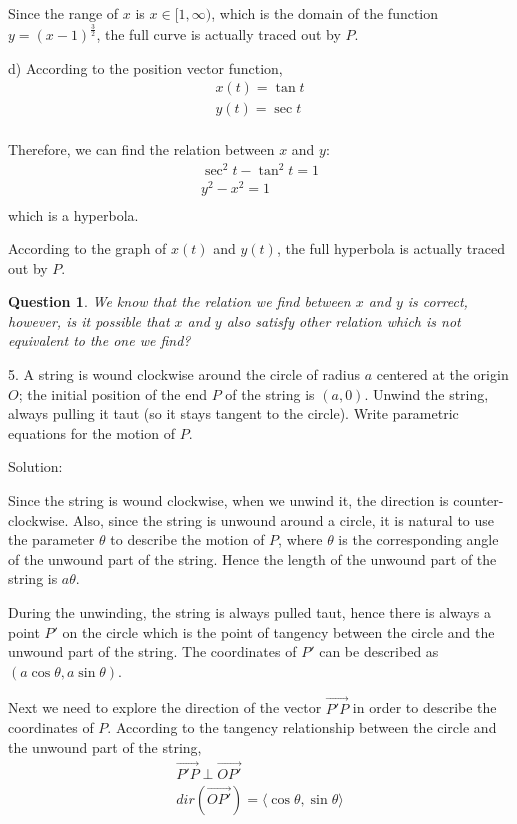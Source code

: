 \documentclass{article}
\newtheorem{question}{Question}
\begin{document}
Since the range of $x$ is $x \in [1, \infty)$, which is the domain of the 
function $y = (x - 1)^{\frac{3}{2}}$, the full curve is actually traced out by 
$P$.

d) According to the position vector function,
\begin{gather*}
  x(t) = \tan t \\
  y(t) = \sec t \\
\end{gather*}

Therefore, we can find the relation between $x$ and $y$:
\begin{gather*}
  \sec^2 t - \tan^2 t = 1 \\
  y^2 - x^2 = 1 \\
\end{gather*}
which is a hyperbola.

According to the graph of $x(t)$ and $y(t)$, the full hyperbola is actually 
traced out by $P$.

\begin{question}
  We know that the relation we find between $x$ and $y$ is correct, however, is 
  it possible that $x$ and $y$ also satisfy other relation which is not 
  equivalent to the one we find?
\end{question}

\bigskip

5. A string is wound clockwise around the circle of radius $a$ centered at the 
origin $O$; the initial position of the end $P$ of the string is $(a, 0)$. 
Unwind the string, always pulling it taut (so it stays tangent to the circle). 
Write parametric equations for the motion of $P$.

Solution:

Since the string is wound clockwise, when we unwind it, the direction is 
counter-clockwise. Also, since the string is unwound around a circle, it is 
natural to use the parameter $\theta$ to describe the motion of $P$, where 
$\theta$ is the corresponding angle of the unwound part of the string. Hence the 
length of the unwound part of the string is $a \theta$.

During the unwinding, the string is always pulled taut, hence there is always a 
point $P'$ on the circle which is the point of tangency between the circle and 
the unwound part of the string. The coordinates of $P'$ can be described as 
$(a \cos\theta, a \sin\theta)$.

Next we need to explore the direction of the vector $\vec{P'P}$ in order to 
describe the coordinates of $P$. According to the tangency relationship between 
the circle and the unwound part of the string,
\begin{gather*}
  \vec{P'P} \perp \vec{OP'} \\
  dir(\vec{OP'}) = \langle \cos\theta, \sin\theta \rangle \\
\end{gather*}
\end{document}
